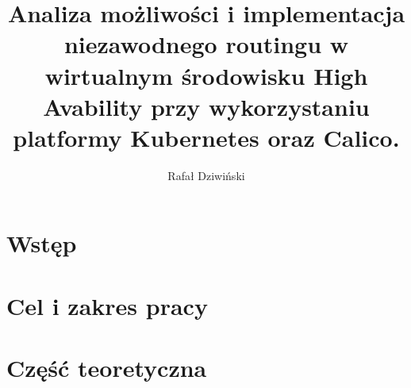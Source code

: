 \documentclass[pl,final,oneside]{mgr} %
\author{Rafał Dziwiński}
\title{Analiza możliwości i implementacja niezawodnego routingu w wirtualnym środowisku High Avability przy wykorzystaniu platformy Kubernetes oraz Calico.}
\begin{document}
\maketitle
\tableofcontents

\chapter{Wstęp}

\chapter{Cel i zakres pracy}

\chapter{Część teoretyczna}
\end{document}

